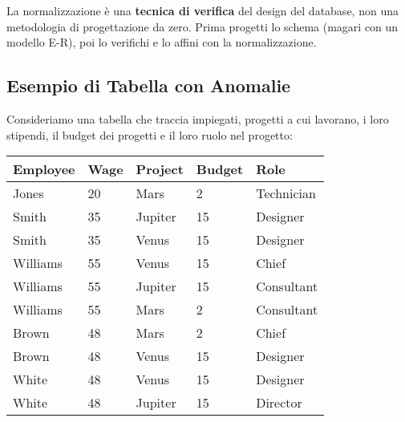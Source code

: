 	La normalizzazione è una \textbf{tecnica di verifica} del design del database, non una metodologia di progettazione da zero. Prima progetti lo schema (magari con un modello E-R), poi lo verifichi e lo affini con la normalizzazione.
	
	\subsection{Esempio di Tabella con Anomalie}
	Consideriamo una tabella che traccia impiegati, progetti a cui lavorano, i loro stipendi, il budget dei progetti e il loro ruolo nel progetto:
	
	\begin{center}
		\begin{tabular}{lllll}
			\toprule
			\textbf{Employee} & \textbf{Wage} & \textbf{Project} & \textbf{Budget} & \textbf{Role} \\
			\midrule
			Jones    & 20   & Mars     & 2      & Technician \\
			Smith    & 35   & Jupiter  & 15     & Designer   \\
			Smith    & 35   & Venus    & 15     & Designer   \\
			Williams & 55   & Venus    & 15     & Chief      \\
			Williams & 55   & Jupiter  & 15     & Consultant \\
			Williams & 55   & Mars     & 2      & Consultant \\
			Brown    & 48   & Mars     & 2      & Chief      \\
			Brown    & 48   & Venus    & 15     & Designer   \\
			White    & 48   & Venus    & 15     & Designer   \\
			White    & 48   & Jupiter  & 15     & Director   \\
			\bottomrule
		\end{tabular}
	\end{center}
	
